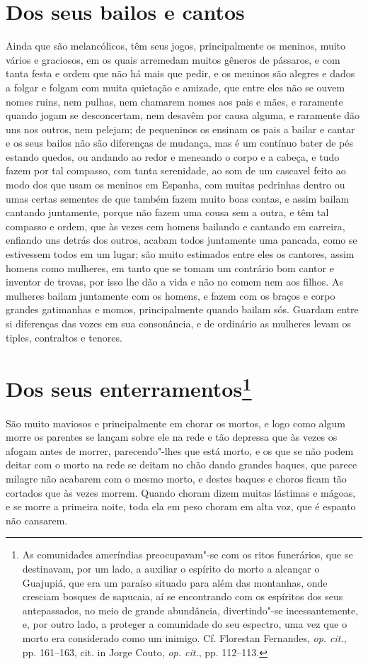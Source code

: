 \section{Dos seus bailos e cantos} 
Ainda que são melancólicos, têm seus jogos, principalmente os
meninos, muito vários e graciosos, em os quais arremedam muitos gêneros
de pássaros, e com tanta festa e ordem que não há mais que pedir, e os
meninos são alegres e dados a folgar e folgam com muita quietação e
amizade, que entre eles não se ouvem nomes ruins, nem pulhas, nem
chamarem nomes aos pais e mães, e raramente quando jogam se
desconcertam, nem desavêm por causa alguma, e raramente dão uns nos
outros, nem pelejam; de pequeninos os ensinam os pais a bailar e cantar
e os seus bailos não são diferenças de mudança, mas é um contínuo bater
de pés estando quedos, ou andando ao redor e meneando o corpo e a
cabeça, e tudo fazem por tal compasso, com tanta serenidade, ao som de
um cascavel feito ao modo dos que usam os meninos em Espanha, com
muitas pedrinhas dentro ou umas certas sementes de que também fazem
muito boas contas, e assim bailam cantando juntamente, porque não fazem
uma cousa sem a outra, e têm tal compasso e ordem, que às vezes cem
homens bailando e cantando em carreira, enfiando uns detrás dos outros,
acabam todos juntamente uma pancada, como se estivessem todos em um
lugar; são muito estimados entre eles os cantores, assim homens como
mulheres, em tanto que se tomam um contrário bom cantor e inventor de
trovas, por isso lhe dão a vida e não no comem nem aos filhos. As
mulheres bailam juntamente com os homens, e fazem com os braços e corpo
grandes gatimanhas e momos, principalmente quando bailam sós. Guardam
entre si diferenças das vozes em sua consonância, e de ordinário as
mulheres levam os tiples, contraltos e tenores. 

\section[Dos seus enterramentos]{Dos seus enterramentos\protect\footnote[*]{ \MakeUppercase{A}s comunidades ameríndias
preocupavam"-se com os ritos funerários, que se destinavam, por um lado,
a auxiliar o espírito do morto a alcançar o \MakeUppercase{G}uajupiá, que era um
paraíso situado para além das montanhas, onde cresciam bosques de
sapucaia, aí se encontrando com os espíritos dos seus antepassados, no
meio de grande abundância, divertindo"-se incessantemente, e, por outro
lado, a proteger a comunidade do seu espectro, uma vez que o morto era
considerado como um inimigo. \MakeUppercase{C}f. \MakeUppercase{F}lorestan \MakeUppercase{F}ernandes, \textit{op.
cit.}, pp. 161--163, cit. in \MakeUppercase{J}orge \MakeUppercase{C}outo, \textit{op. cit.}, pp. 112--113.}} 
 São muito maviosos e principalmente em chorar os mortos, e logo como
algum morre os parentes se lançam sobre ele na rede e tão depressa que
às vezes os afogam antes de morrer, parecendo"-lhes que está morto, e os
que se não podem deitar com o morto na rede se deitam no chão dando
grandes baques, que parece milagre não acabarem com o mesmo morto, e
destes baques e choros ficam tão cortados que às vezes morrem. Quando
choram dizem muitas lástimas e mágoas, e se morre a primeira noite,
toda ela em peso choram em alta voz, que é espanto não cansarem.

